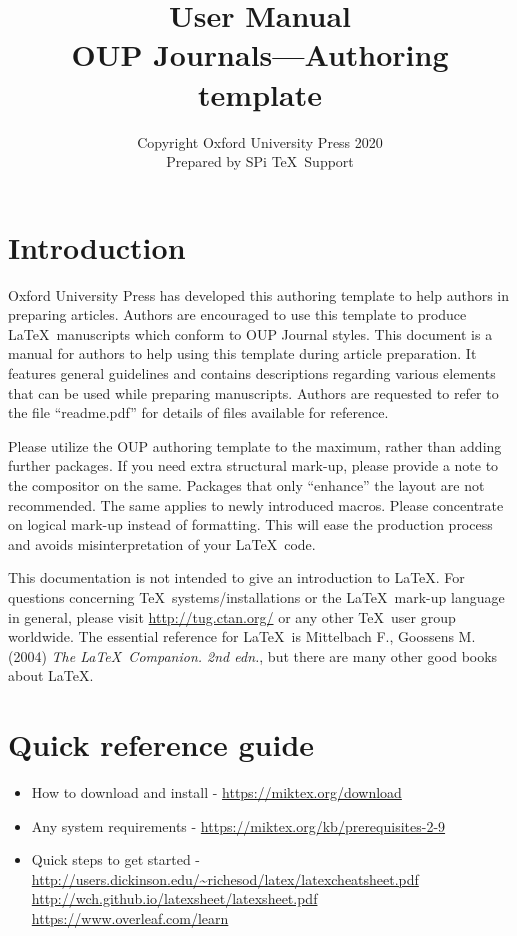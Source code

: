\documentclass{article}
\begin{document}
\title{\bfseries User Manual\\
OUP Journals---Authoring template}

\author{Copyright Oxford University Press 2020\\
\small Prepared by SPi \TeX\ Support}


\maketitle

\tableofcontents

\section{Introduction }
Oxford University Press has developed this authoring template to help authors in preparing articles. Authors are encouraged to use this template to produce \LaTeX\ manuscripts which conform to OUP Journal styles. This document is a manual for authors to help using this template during article preparation. It features general guidelines and contains descriptions regarding various elements that can be used while preparing manuscripts. Authors are requested to refer to the file ``readme.pdf'' for details of files available for reference.

Please utilize the OUP authoring template to the maximum, rather than adding further packages. If you need extra structural mark-up, please provide a note to the compositor on the same. Packages that only ``enhance'' the layout are not recommended. The same applies to newly introduced macros. Please concentrate on logical mark-up instead of formatting. This will ease the production process and avoids misinterpretation of your \LaTeX\ code.

This documentation is not intended to give an introduction to \LaTeX. For questions concerning \TeX\ systems/installations or the \LaTeX\ mark-up language in general, please visit \url{http://tug.ctan.org/} or any other \TeX\ user group worldwide. The essential reference for \LaTeX\ is Mittelbach F., Goossens M. (2004) \textit{The \LaTeX\ Companion. 2nd edn.}, but there are many other good books about \LaTeX.

\section{Quick reference guide}
\begin{itemize}
\item How to download and install - \url{https://miktex.org/download}
\item Any system requirements - \url{https://miktex.org/kb/prerequisites-2-9}
\item Quick steps to get started - \url{http://users.dickinson.edu/~richesod/latex/latexcheatsheet.pdf}\newline
\url{http://wch.github.io/latexsheet/latexsheet.pdf}\newline
\url{https://www.overleaf.com/learn}
\end{itemize}
\end{document}
